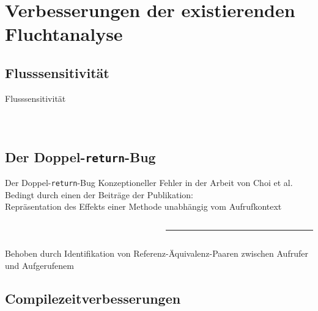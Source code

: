 \documentclass[usenames,dvipsnames,smaller]{beamer}
\begin{document}
	\section{Verbesserungen der existierenden Fluchtanalyse}
		\subsection{Flusssensitivität}
			\begin{frame}{Flusssensitivität}
				\begin{columns}
					\begin{column}{.5\textwidth}
						\inputminted[fontsize=\footnotesize,linenos,tabsize=2,xleftmargin=1.5em]{java}{FlowSensitivity.java}
					\end{column}
					\begin{column}{.5\textwidth}
						
					\end{column}
				\end{columns}
			\end{frame}

		\subsection{Der Doppel-\texttt{return}-Bug}
			\begin{frame}{Der Doppel-\texttt{return}-Bug}
				\bi
					\ii Konzeptioneller Fehler in der Arbeit von Choi et al.
					\ii Bedingt durch einen der Beiträge der Publikation:\\
						Repräsentation des Effekts einer Methode unabhängig vom Aufrufkontext
				\ei
				\begin{columns}
					\begin{column}{.6\textwidth}
						\inputminted[fontsize=\footnotesize,linenos,tabsize=2,xleftmargin=1.5em]{java}{Choose.java}
					\end{column}
					\begin{column}{.4\textwidth}
						\centering
						
						\vspace*{.2cm}
						\hrule
						\vspace*{.2cm}
						
					\end{column}
				\end{columns}
				\bi
					 Behoben durch Identifikation von Referenz-Äquivalenz-Paaren zwischen Aufrufer und Aufgerufenem
				\ei
			\end{frame}

		\subsection{Compilezeitverbesserungen}
\end{document}
